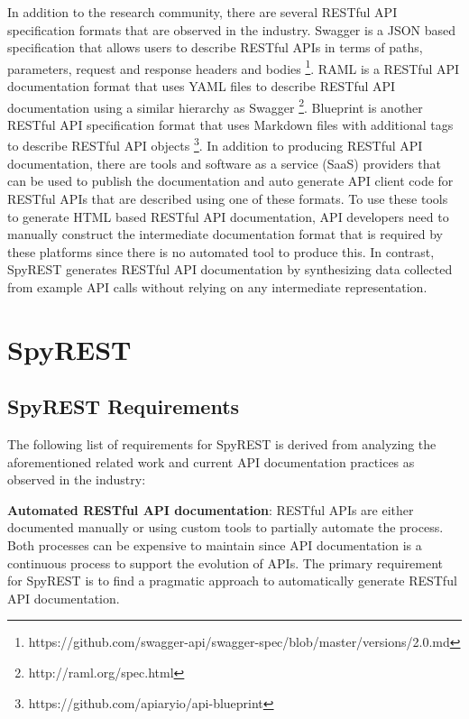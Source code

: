\documentclass[conference]{IEEEtran}
\begin{document}
In addition to the research community, there are several RESTful API specification formats that are observed in the industry. Swagger is a JSON based specification that allows users to describe RESTful APIs in terms of paths, parameters, request and response headers and bodies \footnote{https://github.com/swagger-api/swagger-spec/blob/master/versions/2.0.md}. RAML is a RESTful API documentation format that uses YAML files to describe RESTful API documentation using a similar hierarchy as Swagger \footnote{http://raml.org/spec.html}. Blueprint is another RESTful API specification format that uses Markdown files with additional tags to describe RESTful API objects \footnote{https://github.com/apiaryio/api-blueprint}. In addition to producing RESTful API documentation, there are tools and software as a service (SaaS) providers that can be used to publish the documentation and auto generate API client code for RESTful APIs that are described using one of these formats. To use these tools to generate HTML based RESTful API documentation, API developers need to manually construct the intermediate documentation format that is required by these platforms since there is no automated tool to produce this. In contrast, SpyREST generates RESTful API documentation by synthesizing data collected from example API calls without relying on any intermediate representation.


\section{SpyREST} %
\label{sec:spyrest}

\subsection{SpyREST Requirements} %
\label{sub:spyrest_requirements}

The following list of requirements for SpyREST is derived from analyzing the aforementioned related work and current API documentation practices as observed in the industry:


  \textbf{Automated RESTful API documentation}: RESTful APIs are either documented manually or using custom tools to partially automate the process. Both processes can be expensive to maintain since API documentation is a continuous process to support the evolution of APIs. The primary requirement for SpyREST is to find a pragmatic approach to automatically generate RESTful API documentation.
\end{document}
